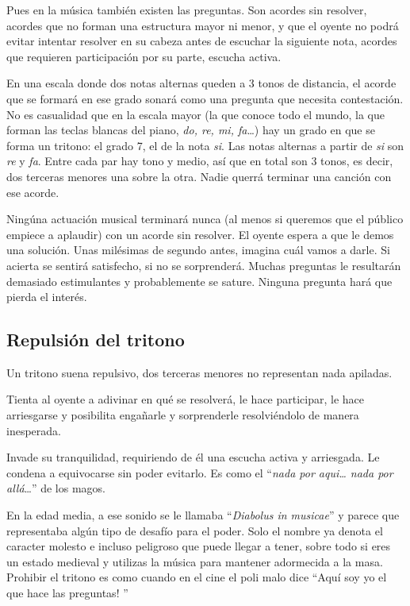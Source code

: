 \documentclass[]{report}
\begin{document}
Pues en la música también existen las preguntas. Son acordes sin resolver, acordes que no forman una estructura mayor ni menor, y que el oyente no podrá evitar intentar resolver en su cabeza antes de escuchar la siguiente nota, acordes que requieren participación por su parte, escucha activa.

En una escala donde dos notas alternas queden a 3 tonos de distancia, el acorde que se formará en ese grado sonará como una pregunta que necesita contestación. No es casualidad que en la escala mayor (la que conoce todo el mundo, la que forman las teclas blancas del piano, \emph{do, re,   mi, fa}\ldots) hay un grado en que se forma un tritono: el grado 7, el de la nota \emph{si}. Las notas alternas a partir de \emph{si} son \emph{re} y \emph{fa}. Entre cada par hay tono y medio, así que en total son 3 tonos, es decir, dos terceras menores una sobre la otra. Nadie querrá terminar una canción con ese acorde.

Ningúna actuación musical terminará nunca (al menos si queremos que el público empiece a aplaudir) con un acorde sin resolver. El oyente espera a que le demos una solución. Unas milésimas de segundo antes, imagina cuál vamos a darle. Si acierta se sentirá satisfecho, si no se sorprenderá. Muchas preguntas le resultarán demasiado estimulantes y probablemente se sature. Ninguna pregunta hará que pierda el interés.

\subsection{Repulsión del tritono}

Un tritono suena repulsivo, dos terceras menores no representan nada apiladas.

Tienta al oyente a adivinar en qué se resolverá, le hace participar, le hace arriesgarse y posibilita engañarle y sorprenderle resolviéndolo de manera inesperada.

Invade su tranquilidad, requiriendo de él una escucha activa y arriesgada. Le condena a equivocarse sin poder evitarlo. Es como el ``\emph{nada por aqui\ldots{}   nada por allá}\ldots{}'' de los magos.

En la edad media, a ese sonido se le llamaba ``\emph{Diabolus in musicae}'' y parece que representaba algún tipo de desafío para el poder. Solo el nombre ya denota el caracter molesto e incluso peligroso que puede llegar a tener, sobre todo si eres un estado medieval y utilizas la música para mantener adormecida a la masa. Prohibir el tritono es como cuando en el cine el poli malo dice ``Aquí soy yo el que hace las preguntas! ''
\end{document}
